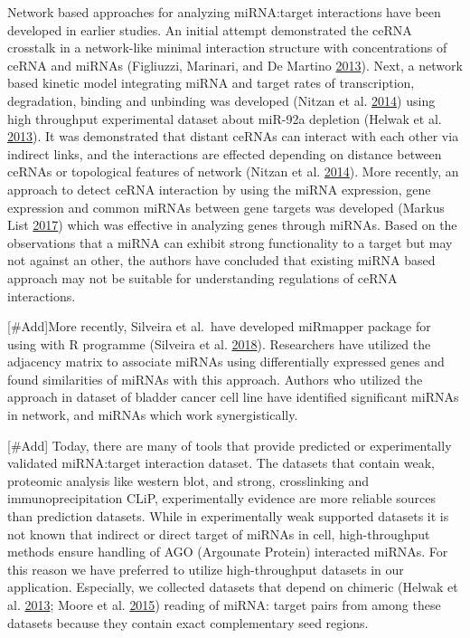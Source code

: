 \documentclass[]{article}
\begin{document}
Network based approaches for analyzing miRNA:target interactions have
been developed in earlier studies. An initial attempt demonstrated the
ceRNA crosstalk in a network-like minimal interaction structure with
concentrations of ceRNA and miRNAs (Figliuzzi, Marinari, and De Martino
\protect\hyperlink{ref-figliuzzi_micrornas_2013}{2013}). Next, a network
based kinetic model integrating miRNA and target rates of transcription,
degradation, binding and unbinding was developed (Nitzan et al.
\protect\hyperlink{ref-nitzan_interactions_2014}{2014}) using high
throughput experimental dataset about miR-92a depletion (Helwak et al.
\protect\hyperlink{ref-helwak_mapping_2013}{2013}). It was demonstrated
that distant ceRNAs can interact with each other via indirect links, and
the interactions are effected depending on distance between ceRNAs or
topological features of network (Nitzan et al.
\protect\hyperlink{ref-nitzan_interactions_2014}{2014}). More recently,
an approach to detect ceRNA interaction by using the miRNA expression,
gene expression and common miRNAs between gene targets was developed
(Markus List \protect\hyperlink{ref-markus_list_sponge_2017}{2017})
which was effective in analyzing genes through miRNAs. Based on the
observations that a miRNA can exhibit strong functionality to a target
but may not against an other, the authors have concluded that existing
miRNA based approach may not be suitable for understanding regulations
of ceRNA interactions.

{[}\#Add{]}More recently, Silveira et al.~have developed miRmapper
package for using with R programme (Silveira et al.
\protect\hyperlink{ref-da2018mirmapper}{2018}). Researchers have
utilized the adjacency matrix to associate miRNAs using differentially
expressed genes and found similarities of miRNAs with this approach.
Authors who utilized the approach in dataset of bladder cancer cell line
have identified significant miRNAs in network, and miRNAs which work
synergistically.

{[}\#Add{]} Today, there are many of tools that provide predicted or
experimentally validated miRNA:target interaction dataset. The datasets
that contain weak, proteomic analysis like western blot, and strong,
crosslinking and immunoprecipitation CLiP, experimentally evidence are
more reliable sources than prediction datasets. While in experimentally
weak supported datasets it is not known that indirect or direct target
of miRNAs in cell, high-throughput methods ensure handling of AGO
(Argounate Protein) interacted miRNAs. For this reason we have preferred
to utilize high-throughput datasets in our application. Especially, we
collected datasets that depend on chimeric (Helwak et al.
\protect\hyperlink{ref-helwak_mapping_2013}{2013}; Moore et al.
\protect\hyperlink{ref-moore_mirnatarget_2015}{2015}) reading of miRNA:
target pairs from among these datasets because they contain exact
complementary seed regions.
\end{document}
